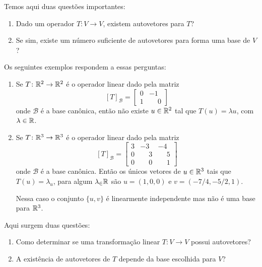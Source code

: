 Temos aqui duas questões importantes:
\begin{enumerate}
    \item Dado um operador $T \colon V \to V$, existem autovetores para $T$?

    \item Se sim, existe um número suficiente de autovetores para forma uma base de $V$?
\end{enumerate}

Os seguintes exemplos respondem a essas perguntas:

\begin{exemplos}
    \begin{enumerate}
        \item Se $T \colon \mathbb{R}^2 \to \mathbb{R}^2$ é o operador linear dado pela matriz
        \[
            [T]_\mathcal{B} = \begin{bmatrix}0 & -1\\1 & \phantom{-}0\end{bmatrix}
        \]
        onde $\mathcal{B}$ é a base canônica, então não existe $u \in \mathbb{R}^2$ tal que $T(u) = \lambda u$, com $\lambda \in \mathbb{R}$.

        \item Se $T \colon \mathbb{R}^3 \to \mathbb{R}^3$ é o operador linear dado pela matriz
        \[
        [T]_\mathcal{B} = \begin{bmatrix}3 & -3 & -4\\0 & \phantom{-}3 & \phantom{-}5\\0 & \phantom{-}0 & \phantom{-}1\end{bmatrix}
        \]
        onde $\mathcal{B}$ é a base canônica. Então os únicos vetores de $u \in \mathbb{R}^3$ tais que $T(u) = \lambda_u$, para algum
        $\lambda_\in \mathbb{R}$ são $u = (1, 0, 0)$ e $v = (-7/4, -5/2, 1)$.

        Nessa caso o conjunto $\{u, v\}$ é linearmente independente mas não é uma base para $\mathbb{R}^3$.
    \end{enumerate}
\end{exemplos}

Aqui surgem duas questões:
\begin{enumerate}
    \item Como determinar se uma transformação linear $T \colon V \to V$ possui autovetores?

    \item A existência de autovetores de $T$ depende da base escolhida para $V$?
\end{enumerate}


